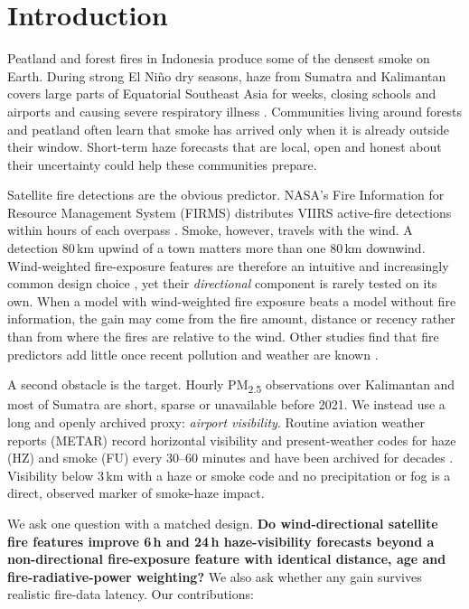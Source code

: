 \section{Introduction}
\label{sec:intro}

Peatland and forest fires in Indonesia produce some of the densest smoke on Earth. During strong
El Niño dry seasons, haze from Sumatra and Kalimantan covers large parts of Equatorial Southeast
Asia for weeks, closing schools and airports and causing severe respiratory illness
\citep{huang2024haze}. Communities living around forests and peatland often learn that smoke has
arrived only when it is already outside their window. Short-term haze forecasts that are local,
open and honest about their uncertainty could help these communities prepare.

Satellite fire detections are the obvious predictor. NASA's Fire Information for Resource
Management System (FIRMS) distributes VIIRS active-fire detections within hours of each overpass
\citep{firms}. Smoke, however, travels with the wind. A detection 80\,km upwind of a town matters
more than one 80\,km downwind. Wind-weighted fire-exposure features are therefore an intuitive and
increasingly common design choice \citep{gnnfire2023,sci2026exposure}, yet their \emph{directional}
component is rarely tested on its own. When a model with wind-weighted fire exposure beats a
model without fire information, the gain may come from the fire amount, distance or recency rather
than from where the fires are relative to the wind. Other studies find that fire predictors add
little once recent pollution and weather are known \citep{santacruz2026}.

A second obstacle is the target. Hourly PM\textsubscript{2.5} observations over Kalimantan and most
of Sumatra are short, sparse or unavailable before 2021. We instead use a long and openly
archived proxy: \emph{airport visibility}. Routine aviation weather reports (METAR) record
horizontal visibility and present-weather codes for haze (HZ) and smoke (FU) every 30--60 minutes
and have been archived for decades \citep{iem}. Visibility below 3\,km with a haze or smoke code
and no precipitation or fog is a direct, observed marker of smoke-haze impact.

We ask one question with a matched design. \textbf{Do wind-directional satellite fire features
improve 6\,h and 24\,h haze-visibility forecasts beyond a non-directional fire-exposure feature with
identical distance, age and fire-radiative-power weighting?} We also ask whether any gain survives
realistic fire-data latency. Our contributions:

